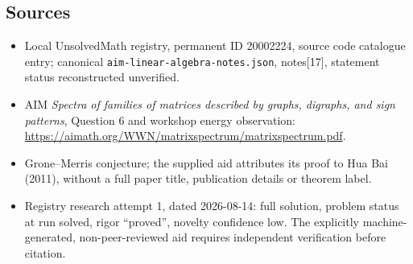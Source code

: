 \documentclass[11pt]{article}
\begin{document}
\subsection{Sources}
\begin{itemize}
\item Local UnsolvedMath registry, permanent ID 20002224, source code catalogue entry; canonical \texttt{aim-linear-algebra-notes.json}, notes[17], statement status reconstructed unverified.
\item AIM \emph{Spectra of families of matrices described by graphs, digraphs, and sign patterns}, Question 6 and workshop energy observation: \url{https://aimath.org/WWN/matrixspectrum/matrixspectrum.pdf}.
\item Grone--Merris conjecture; the supplied aid attributes its proof to Hua Bai (2011), without a full paper title, publication details or theorem label.
\item Registry research attempt 1, dated 2026-08-14: full solution, problem status at run solved, rigor ``proved'', novelty confidence low. The explicitly machine-generated, non-peer-reviewed aid requires independent verification before citation.
\end{itemize}
\end{document}
